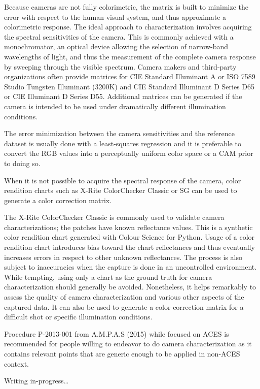 Because cameras are not fully colorimetric, the matrix is built to minimize the error with respect to the human visual system, and thus approximate a colorimetric response. The ideal approach to characterization involves acquiring the spectral sensitivities of the camera. This is commonly achieved with a monochromator, an optical device allowing the selection of narrow-band wavelengths of light, and thus the measurement of the complete camera response by sweeping through the visible spectrum. Camera makers and third-party organizations often provide matrices for CIE Standard Illuminant A or ISO 7589 Studio Tungsten Illuminant (3200K) and CIE Standard Illuminant D Series D65 or CIE Illuminant D Series D55. Additional matrices can be generated if the camera is intended to be used under dramatically different illumination conditions.

The error minimization between the camera sensitivities and the reference dataset is usually done with a least-squares regression and it is preferable to convert the RGB values into a perceptually uniform color space or a CAM prior to doing so.

When it is not possible to acquire the spectral response of the camera, color rendition charts such as X-Rite ColorChecker Classic or SG can be used to generate a color correction matrix.

The X-Rite  ColorChecker Classic is commonly used to validate camera characterizations; the patches have known reflectance values. This is a synthetic color rendition chart generated with Colour Science for Python.
Usage of a color rendition chart introduces bias toward the chart reflectances and thus eventually increases errors in respect to other unknown reflectances. The process is also subject to inaccuracies when the capture is done in an uncontrolled environment. While tempting, using only a chart as the ground truth for camera characterization should generally be avoided. Nonetheless, it helps remarkably to assess the quality of camera characterization and various other aspects of the captured data. It can also be used to generate a color correction matrix for a difficult shot or specific illumination conditions.


Procedure P-2013-001 from A.M.P.A.S (2015) while focused on ACES is recommended for people willing to endeavor to do camera characterization as it contains relevant points that are generic enough to be applied in non-ACES context.


Writing in-progress…

